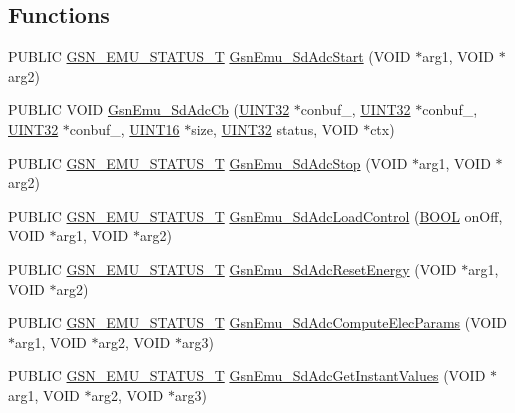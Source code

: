 \subsection*{Functions}
\begin{DoxyCompactItemize}
\item 
PUBLIC \hyperlink{a00490_aeda27e2bd7f74b1b9748e313d272033e}{GSN\_\-EMU\_\-STATUS\_\-T} \hyperlink{a00492_ae7e56ad6c9fcbc26066cb8a0f430b997}{GsnEmu\_\-SdAdcStart} (VOID $\ast$arg1, VOID $\ast$arg2)
\item 
PUBLIC VOID \hyperlink{a00492_af245a5d5ab0ef8f194a7ad8ee987b969}{GsnEmu\_\-SdAdcCb} (\hyperlink{a00660_gae1e6edbbc26d6fbc71a90190d0266018}{UINT32} $\ast$conbuf\_, \hyperlink{a00660_gae1e6edbbc26d6fbc71a90190d0266018}{UINT32} $\ast$conbuf\_, \hyperlink{a00660_gae1e6edbbc26d6fbc71a90190d0266018}{UINT32} $\ast$conbuf\_, \hyperlink{a00660_ga09f1a1fb2293e33483cc8d44aefb1eb1}{UINT16} $\ast$size, \hyperlink{a00660_gae1e6edbbc26d6fbc71a90190d0266018}{UINT32} status, VOID $\ast$ctx)
\item 
PUBLIC \hyperlink{a00490_aeda27e2bd7f74b1b9748e313d272033e}{GSN\_\-EMU\_\-STATUS\_\-T} \hyperlink{a00492_a179dbbfd2be61b47b68f64bec2c7b8d4}{GsnEmu\_\-SdAdcStop} (VOID $\ast$arg1, VOID $\ast$arg2)
\item 
PUBLIC \hyperlink{a00490_aeda27e2bd7f74b1b9748e313d272033e}{GSN\_\-EMU\_\-STATUS\_\-T} \hyperlink{a00492_a251e562bcf429a596f9c08e1082213fe}{GsnEmu\_\-SdAdcLoadControl} (\hyperlink{a00660_ga1f04022c0a182c51c059438790ea138c}{BOOL} onOff, VOID $\ast$arg1, VOID $\ast$arg2)
\item 
PUBLIC \hyperlink{a00490_aeda27e2bd7f74b1b9748e313d272033e}{GSN\_\-EMU\_\-STATUS\_\-T} \hyperlink{a00492_a387c3bf6b3480eac8633a2ea45a059d5}{GsnEmu\_\-SdAdcResetEnergy} (VOID $\ast$arg1, VOID $\ast$arg2)
\item 
PUBLIC \hyperlink{a00490_aeda27e2bd7f74b1b9748e313d272033e}{GSN\_\-EMU\_\-STATUS\_\-T} \hyperlink{a00492_acc9bb7d53df04b918f54f6db7c3ffbd5}{GsnEmu\_\-SdAdcComputeElecParams} (VOID $\ast$arg1, VOID $\ast$arg2, VOID $\ast$arg3)
\item 
PUBLIC \hyperlink{a00490_aeda27e2bd7f74b1b9748e313d272033e}{GSN\_\-EMU\_\-STATUS\_\-T} \hyperlink{a00492_a98638ba0f755bad96bda4e1dfbf153a4}{GsnEmu\_\-SdAdcGetInstantValues} (VOID $\ast$arg1, VOID $\ast$arg2, VOID $\ast$arg3)
\end{DoxyCompactItemize}


